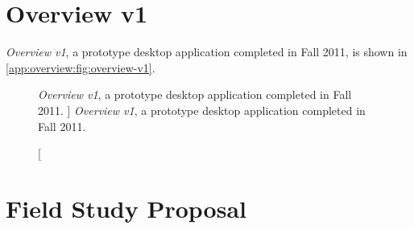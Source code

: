 

\section{Overview v1}
\label{app:overview:v1}


\textsl{Overview v1}, a prototype desktop application completed in Fall 2011, is shown in \autoref{app:overview:fig:overview-v1}.


\begin{figure}
	\centering
	\caption
	[
	    \textsl{Overview v1}, a prototype desktop application completed in Fall 2011.
	]
	{
    	\textsl{Overview v1}, a prototype desktop application completed in Fall 2011.
	}
	\centering
	\label{app:overview:fig:overview-v1}
\end{figure}



\section{Field Study Proposal}
\label{app:overview:proposal}

